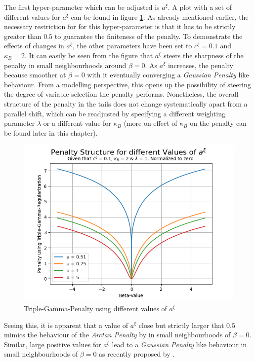 \documentclass[12pt,a4paper]{article}
\begin{document}
The first hyper-parameter which can be adjusted is $a^\xi$. A plot with a set of different values for $a^\xi$ can be found in figure \ref{fig:VariationInA}. As already mentioned earlier, the necessary restriction for for this hyper-parameter is that it has to be strictly greater than $0.5$ to guarantee the finiteness of the penalty. To demonstrate the effects of changes in $a^\xi$, the other parameters have been set to $c^\xi=0.1$ and $\kappa_B=2$. It can easily be seen from the figure that $a^\xi$ steers the sharpness of the penalty in small neighbourhoods around $\beta=0$. As $a^\xi$ increases, the penalty because smoother at $\beta=0$ with it eventually converging a \textit{Gaussian Penalty} like behaviour. From a modelling perspective, this opens up the possibility of steering the degree of variable selection the penalty performs. Nonetheless, the overall structure of the penalty in the tails does not change systematically apart from a parallel shift, which can be readjusted by specifying a different weighting parameter $\lambda$ or a different value for $\kappa_B$ (more on effect of $\kappa_B$ on the penalty can be found later in this chapter).\\ 

\begin{figure}[!h]
\centering
\includegraphics[scale=0.75]{../02_simulation/021_simulation_figures/TGPenalty_ChangeInA.png}
\caption{Triple-Gamma-Penalty using different values of $a^\xi$}
\label{fig:VariationInA}
\end{figure}

Seeing this, it is apparent that a value of $a^\xi$ close but strictly larger that $0.5$ mimics the behaviour of the \textit{Arctan Penalty} by \textcite{WangZhu2016} in small neighbourhoods of $\beta=0$. Similar, large positive values for $a^\xi$ lead to a \textit{Gaussian Penalty} like behaviour in small neighbourhoods of $\beta = 0$ as recently proposed by \textcite{JohnVettamWu2022}.\\
\newpage
\end{document}
